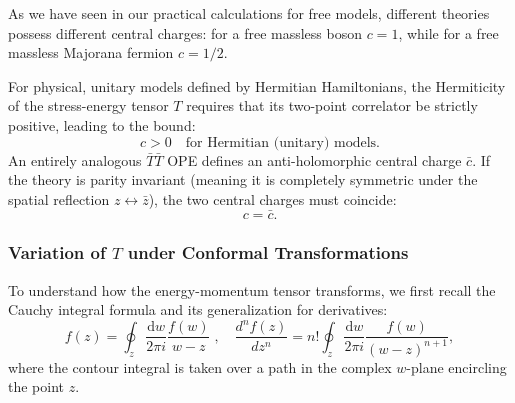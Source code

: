 As we have seen in our practical calculations for free models, different theories possess different central charges: for a free massless boson \(c = 1\), while for a free massless Majorana fermion \(c = 1/2\).

For physical, unitary models defined by Hermitian Hamiltonians, the Hermiticity of the stress-energy tensor \(T\) requires that its two-point correlator be strictly positive, leading to the bound:
\[
    c > 0 \quad \text{for Hermitian (unitary) models}.
\]
An entirely analogous \(\bar{T}\bar{T}\) OPE defines an anti-holomorphic central charge \(\bar{c}\). If the theory is parity invariant (meaning it is completely symmetric under the spatial reflection \(z \leftrightarrow \bar{z}\)), the two central charges must coincide:
\[
    c = \bar{c}.
\]

\subsubsection{Variation of \(T\) under Conformal Transformations}

To understand how the energy-momentum tensor transforms, we first recall the Cauchy integral formula and its generalization for derivatives:
\[
    f(z) = \oint_z \frac{\mathrm{d} w}{2\pi i} \frac{f(w)}{w - z} \;, \quad \frac{d^n f(z)}{dz^n} = n! \oint_z \frac{\mathrm{d} w}{2\pi i} \frac{f(w)}{(w - z)^{n+1}},
\]
where the contour integral is taken over a path in the complex \(w\)-plane encircling the point \(z\).

